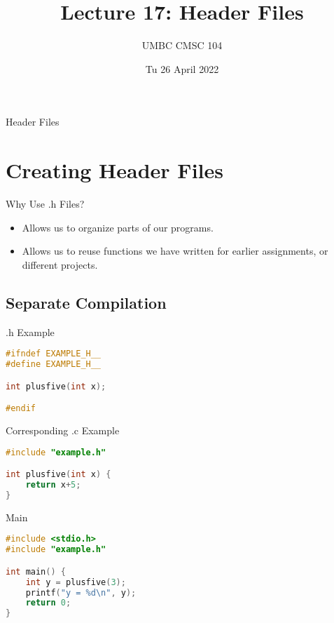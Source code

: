 \documentclass[graphics]{beamer}
\title{Lecture 17: Header Files}
\author{UMBC CMSC 104}
\date{Tu 26 April 2022}
\begin{document}
\begin{frame}{}
\centering
    Header Files
\end{frame}

\frame{\tableofcontents}

\section{Creating Header Files}
\begin{frame}{Why Use .h Files?}
    \begin{itemize}
        \item Allows us to organize parts of our programs.
        \item Allows us to reuse functions we have written for earlier assignments, or different projects.
    \end{itemize}
\end{frame}

\subsection{Separate Compilation}
\begin{frame}[fragile]{.h Example}
    \begin{lstlisting}[language=C,basicstyle=\footnotesize,keywordstyle=\color{blue},commentstyle=\color{green},showstringspaces=false,stringstyle=\color{red}]
#ifndef EXAMPLE_H__
#define EXAMPLE_H__

int plusfive(int x);

#endif
    \end{lstlisting}
\end{frame}

\begin{frame}[fragile]{Corresponding .c Example}
    \begin{lstlisting}[language=C,basicstyle=\footnotesize,keywordstyle=\color{blue},commentstyle=\color{green},showstringspaces=false,stringstyle=\color{red}]
#include "example.h"

int plusfive(int x) {
    return x+5;
}
    \end{lstlisting}
\end{frame}

\begin{frame}[fragile]{Main}
    \begin{lstlisting}[language=C,basicstyle=\footnotesize,keywordstyle=\color{blue},commentstyle=\color{green},showstringspaces=false,stringstyle=\color{red}]
#include <stdio.h>
#include "example.h"

int main() {
    int y = plusfive(3);
    printf("y = %d\n", y);
    return 0;
}
    \end{lstlisting}
\end{frame}
\end{document}
